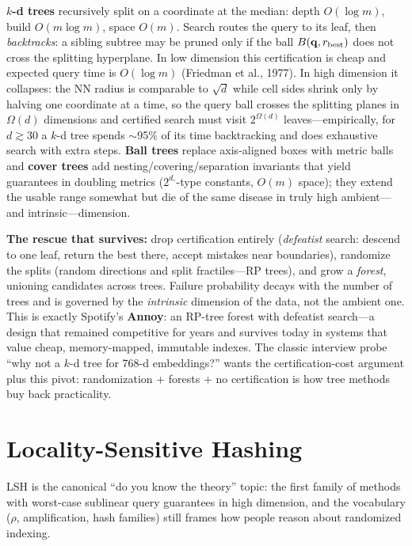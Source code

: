 \textbf{$k$-d trees} recursively split on a coordinate at the median: depth $O(\log m)$, build $O(m \log m)$, space $O(m)$. Search routes the query to its leaf, then \emph{backtracks}: a sibling subtree may be pruned only if the ball $B(\mathbf{q}, r_{\text{best}})$ does not cross the splitting hyperplane. In low dimension this certification is cheap and expected query time is $O(\log m)$ (Friedman et al., 1977). In high dimension it collapses: the NN radius is comparable to $\sqrt{d}$ while cell sides shrink only by halving one coordinate at a time, so the query ball crosses the splitting planes in $\Omega(d)$ dimensions and certified search must visit $2^{\Omega(d)}$ leaves---empirically, for $d \gtrsim 30$ a $k$-d tree spends $\sim$95\% of its time backtracking and does exhaustive search with extra steps. \textbf{Ball trees} replace axis-aligned boxes with metric balls and \textbf{cover trees} add nesting/covering/separation invariants that yield guarantees in doubling metrics ($2^{d_\circ}$-type constants, $O(m)$ space); they extend the usable range somewhat but die of the same disease in truly high ambient---and intrinsic---dimension.

\textbf{The rescue that survives:} drop certification entirely (\emph{defeatist} search: descend to one leaf, return the best there, accept mistakes near boundaries), randomize the splits (random directions and split fractiles---RP trees), and grow a \emph{forest}, unioning candidates across trees. Failure probability decays with the number of trees and is governed by the \emph{intrinsic} dimension of the data, not the ambient one. This is exactly Spotify's \textbf{Annoy}: an RP-tree forest with defeatist search---a design that remained competitive for years and survives today in systems that value cheap, memory-mapped, immutable indexes. The classic interview probe ``why not a $k$-d tree for 768-d embeddings?'' wants the certification-cost argument plus this pivot: randomization + forests + no certification is how tree methods buy back practicality.

\section{Locality-Sensitive Hashing}
\label{sr:sec:vr_lsh}

LSH is the canonical ``do you know the theory'' topic: the first family of methods with worst-case sublinear query guarantees in high dimension, and the vocabulary ($\rho$, amplification, hash families) still frames how people reason about randomized indexing.

